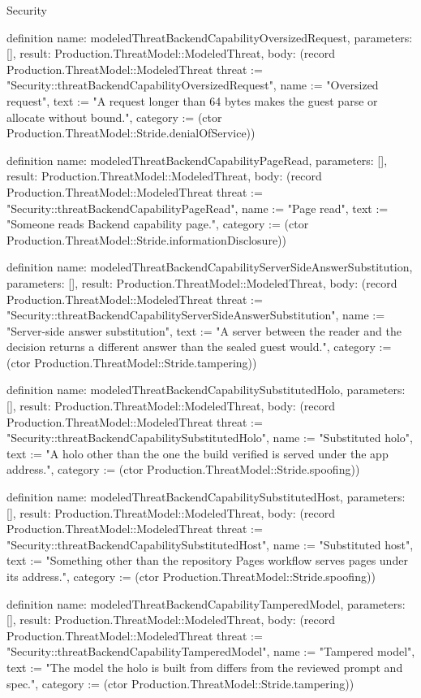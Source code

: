 \begin{lexlean}{Security}
\begin{semanticmodule}
definition{
  name: modeledThreatBackendCapabilityOversizedRequest,
  parameters: [],
  result: Production.ThreatModel::ModeledThreat,
  body: (record Production.ThreatModel::ModeledThreat {threat := "Security::threatBackendCapabilityOversizedRequest", name := "Oversized request", text := "A request longer than 64 bytes makes the guest parse or allocate without bound.", category := (ctor Production.ThreatModel::Stride.denialOfService)})
}

definition{
  name: modeledThreatBackendCapabilityPageRead,
  parameters: [],
  result: Production.ThreatModel::ModeledThreat,
  body: (record Production.ThreatModel::ModeledThreat {threat := "Security::threatBackendCapabilityPageRead", name := "Page read", text := "Someone reads Backend capability page.", category := (ctor Production.ThreatModel::Stride.informationDisclosure)})
}

definition{
  name: modeledThreatBackendCapabilityServerSideAnswerSubstitution,
  parameters: [],
  result: Production.ThreatModel::ModeledThreat,
  body: (record Production.ThreatModel::ModeledThreat {threat := "Security::threatBackendCapabilityServerSideAnswerSubstitution", name := "Server-side answer substitution", text := "A server between the reader and the decision returns a different answer than the sealed guest would.", category := (ctor Production.ThreatModel::Stride.tampering)})
}

definition{
  name: modeledThreatBackendCapabilitySubstitutedHolo,
  parameters: [],
  result: Production.ThreatModel::ModeledThreat,
  body: (record Production.ThreatModel::ModeledThreat {threat := "Security::threatBackendCapabilitySubstitutedHolo", name := "Substituted holo", text := "A holo other than the one the build verified is served under the app address.", category := (ctor Production.ThreatModel::Stride.spoofing)})
}

definition{
  name: modeledThreatBackendCapabilitySubstitutedHost,
  parameters: [],
  result: Production.ThreatModel::ModeledThreat,
  body: (record Production.ThreatModel::ModeledThreat {threat := "Security::threatBackendCapabilitySubstitutedHost", name := "Substituted host", text := "Something other than the repository Pages workflow serves pages under its address.", category := (ctor Production.ThreatModel::Stride.spoofing)})
}

definition{
  name: modeledThreatBackendCapabilityTamperedModel,
  parameters: [],
  result: Production.ThreatModel::ModeledThreat,
  body: (record Production.ThreatModel::ModeledThreat {threat := "Security::threatBackendCapabilityTamperedModel", name := "Tampered model", text := "The model the holo is built from differs from the reviewed prompt and spec.", category := (ctor Production.ThreatModel::Stride.tampering)})
}


\end{semanticmodule}
\end{lexlean}
